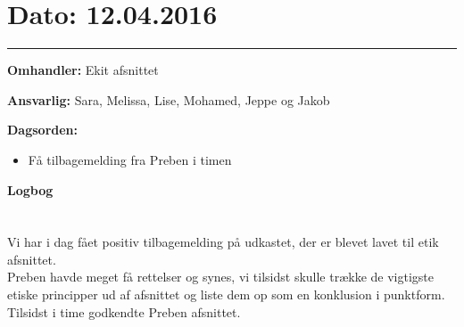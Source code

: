 

\section{Dato: 12.04.2016}
\hrule

\textbf{Omhandler:} Ekit afsnittet

\textbf{Ansvarlig:} Sara, Melissa, Lise, Mohamed, Jeppe og Jakob

\textbf{Dagsorden:}
\begin{itemize}
	\item Få tilbagemelding fra Preben i timen
\end{itemize}

\textbf{Logbog}
\\
\\ \\
Vi har i dag fået positiv tilbagemelding på udkastet, der er blevet lavet til etik afsnittet. \\
Preben havde meget få rettelser og synes, vi tilsidst skulle trække de vigtigste etiske principper ud af afsnittet og liste dem op som en konklusion i punktform. \\
Tilsidst i time godkendte Preben afsnittet. 



